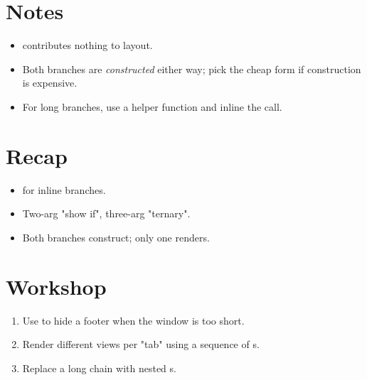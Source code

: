 \section{Notes}

\begin{itemize}[leftmargin=*]
  \item {} contributes nothing to layout.
  \item Both branches are \emph{constructed} either way;
    pick the cheap form if construction is expensive.
  \item For long branches, use a helper function and inline
    the call.
\end{itemize}

\section{Recap}

\begin{recap}
\begin{itemize}[leftmargin=*]
  \item {} for inline branches.
  \item Two-arg "show if", three-arg "ternary".
  \item Both branches construct; only one renders.
\end{itemize}
\end{recap}

\section*{Workshop}

\begin{enumerate}[leftmargin=*]
  \item Use  to hide a footer when the window is
    too short.
  \item Render different views per "tab" using a sequence of
    s.
  \item Replace a long  chain with nested
    s.
\end{enumerate}
